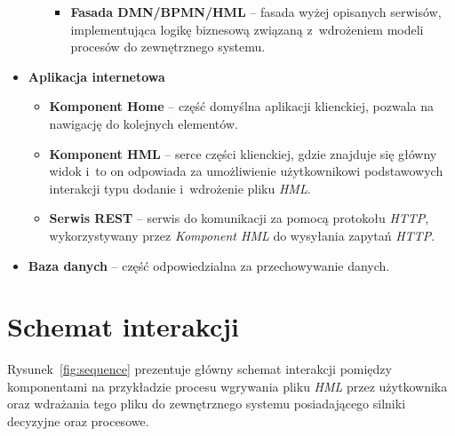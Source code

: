\begin{itemize}
\begin{itemize}
\begin{itemize}
                    \item \textbf{Fasada DMN/BPMN/HML} -- fasada wyżej opisanych serwisów, implementująca logikę biznesową związaną z~wdrożeniem modeli procesów do zewnętrznego systemu.
                \end{itemize}
        \end{itemize}
    \item \textbf{Aplikacja internetowa}
        \begin{itemize}
            \item \textbf{Komponent Home} -- część domyślna aplikacji klienckiej, pozwala na nawigację do kolejnych elementów.
            \item \textbf{Komponent HML} -- serce części klienckiej, gdzie znajduje się główny widok i~to on odpowiada za umożliwienie użytkownikowi podstawowych interakcji typu dodanie i~wdrożenie pliku \emph{HML}.
            \item \textbf{Serwis REST} -- serwis do komunikacji za pomocą protokołu \emph{HTTP}, wykorzystywany przez \emph{Komponent HML} do wysyłania zapytań \emph{HTTP}.
        \end{itemize} 
    \item \textbf{Baza danych} -- część odpowiedzialna za przechowywanie danych.
\end{itemize}

\section{Schemat interakcji}
Rysunek~\ref{fig:sequence} prezentuje główny schemat interakcji pomiędzy komponentami na przykładzie procesu wgrywania pliku \emph{HML} przez użytkownika oraz wdrażania tego pliku do zewnętrznego systemu posiadającego silniki decyzyjne oraz procesowe. 

